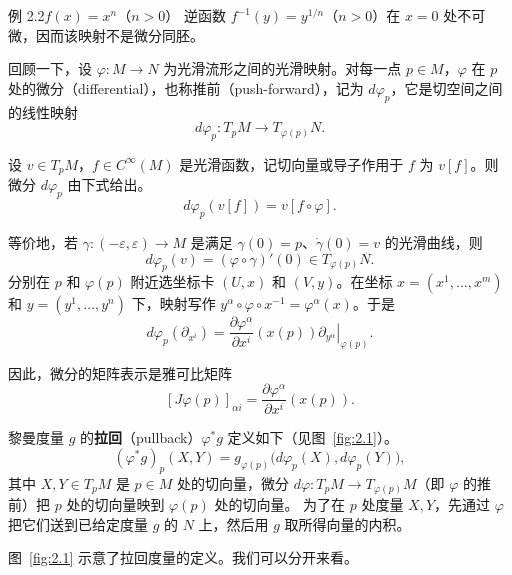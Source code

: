 \begin{statement}{例 2.2}{$f(x)=x^n$（$n>0$）}
逆函数 $f^{-1}(y)=y^{1/n}$（$n>0$）在 $x=0$ 处不可微，因而该映射不是微分同胚。
\end{statement}

回顾一下，设 $\varphi\colon M\to N$ 为光滑流形之间的光滑映射。对每一点 $p\in M$，$\varphi$ 在 $p$ 处的微分（differential），也称推前（push-forward），记为 $d\varphi_p$，它是切空间之间的线性映射
\[
  d\varphi_p\colon T_pM\longrightarrow T_{\varphi(p)}N.
\]

设 $v\in T_pM$，$f\in C^\infty(M)$ 是光滑函数，记切向量或导子作用于 $f$ 为 $v[f]$。则微分 $d\varphi_p$ 由下式给出。
\[
  d\varphi_p(v[f])=v[f\circ\varphi].
\]

等价地，若 $\gamma\colon(-\varepsilon,\varepsilon)\to M$ 是满足 $\gamma(0)=p$、$\dot\gamma(0)=v$ 的光滑曲线，则
\[
  d\varphi_p(v)=(\varphi\circ\gamma)'(0)\in T_{\varphi(p)}N.
\]
分别在 $p$ 和 $\varphi(p)$ 附近选坐标卡 $(U,x)$ 和 $(V,y)$。在坐标 $x=(x^1,\ldots,x^m)$ 和 $y=(y^1,\ldots,y^n)$ 下，映射写作 $y^\alpha\circ\varphi\circ x^{-1}=\varphi^\alpha(x)$。于是
\[
  d\varphi_p(\partial_{x^i})=
    \frac{\partial\varphi^\alpha}{\partial x^i}(x(p))
    \left.\partial_{y^\alpha}\right|_{\varphi(p)}.
\]

\begin{figure}[htbp]
  \centering
  
\end{figure}
因此，微分的矩阵表示是雅可比矩阵
\[
  [J\varphi(p)]_{\alpha i}=
  \frac{\partial\varphi^\alpha}{\partial x^i}(x(p)).
\]

黎曼度量 $g$ 的\textbf{拉回}（pullback）$\varphi^*g$ 定义如下（见图~\ref{fig:2.1}）。
\[
  (\varphi^*g)_p(X,Y)
  =g_{\varphi(p)}\bigl(d\varphi_p(X),d\varphi_p(Y)\bigr),
\]
其中 $X,Y\in T_pM$ 是 $p\in M$ 处的切向量，微分 $d\varphi\colon T_pM\to T_{\varphi(p)}M$（即 $\varphi$ 的推前）把 $p$ 处的切向量映到 $\varphi(p)$ 处的切向量。
为了在 $p$ 处度量 $X,Y$，先通过 $\varphi$ 把它们送到已给定度量 $g$ 的 $N$ 上，然后用 $g$ 取所得向量的内积。

图~\ref{fig:2.1} 示意了拉回度量的定义。我们可以分开来看。

